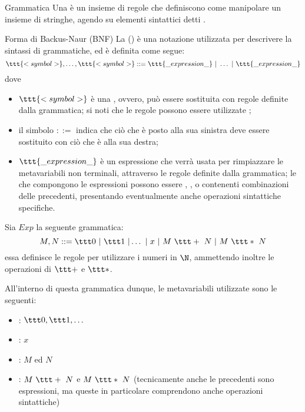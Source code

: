 \documentclass[a4paper, 12pt]{report}
\begin{document}
    \begin{frameddefn}{Grammatica}
        Una  è un insieme di regole che definiscono come manipolare un insieme di stringhe, agendo su elementi sintattici detti .
    \end{frameddefn}

    \begin{frameddefn}{Forma di Backus-Naur (BNF)}
        La  () è una notazione utilizzata per descrivere la sintassi di grammatiche, ed è definita come segue: $$\ttt{<symbol>}, \ldots, \ttt{<symbol>} ::= \ttt{\_expression\_} \ | \ \ldots \ | \ \ttt{\_expression\_}$$ dove
        \begin{itemize}
            \item $\ttt{<symbol>}$ è una , ovvero, può essere sostituita con regole definite dalla grammatica; si noti che le regole possono essere utilizzate ;
            \item il simbolo $::=$ indica che ciò che è posto alla sua sinistra deve essere sostituito con ciò che è alla sua destra;
            \item $\ttt{\_expression\_}$ è un espressione che verrà usata per rimpiazzare le metavariabili non terminali, attraverso le regole definite dalla grammatica; le  che compongono le espressioni possono essere , ,  o  contenenti combinazioni delle precedenti, presentando eventualmente anche operazioni sintattiche specifiche.
        \end{itemize}
    \end{frameddefn}

    \begin{example}
        \label{exp}
        Sia $Exp$ la seguente grammatica: $$M, N ::= \ttt 0 \ | \ \ttt 1 \ | \ldots \ | \ x \ | \ M \ \ttt + \ N \ | \ M \ \ttt * \ N$$ essa definisce le regole per utilizzare i numeri in $\N$, ammettendo inoltre le operazioni  di $\ttt +$ e $\ttt *$.

        All'interno di questa grammatica dunque, le metavariabili utilizzate sono le seguenti:
        \begin{itemize}
            \item {}: $\ttt 0, \ttt 1,  \ldots$
            \item {}: $x$
            \item {}: $M$ ed $N$
            \item {}: $M \ \ttt + \ N$ e $M \ \ttt * \ N$ (tecnicamente anche le precedenti sono espressioni, ma queste in particolare comprendono anche operazioni sintattiche)
        \end{itemize}
    \end{example}
\end{document}
